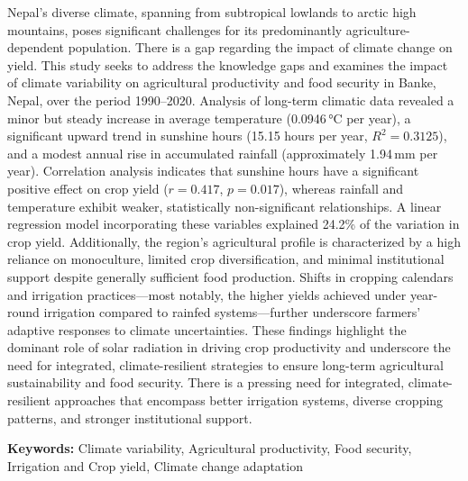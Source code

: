 Nepal's diverse climate, spanning from subtropical lowlands to arctic high mountains, poses significant challenges for its predominantly agriculture-dependent population. There is a gap regarding the impact of climate change on yield. This study seeks to address the knowledge gaps and examines the impact of climate variability on agricultural productivity and food security in Banke, Nepal, over the period 1990--2020. Analysis of long-term climatic data revealed a minor but steady increase in average temperature (0.0946\,°C per year), a significant upward trend in sunshine hours (15.15 hours per year, $R^2 = 0.3125$), and a modest annual rise in accumulated rainfall (approximately 1.94\,mm per year). Correlation analysis indicates that sunshine hours have a significant positive effect on crop yield ($r = 0.417$, $p = 0.017$), whereas rainfall and temperature exhibit weaker, statistically non-significant relationships. A linear regression model incorporating these variables explained 24.2\% of the variation in crop yield. Additionally, the region's agricultural profile is characterized by a high reliance on monoculture, limited crop diversification, and minimal institutional support despite generally sufficient food production. Shifts in cropping calendars and irrigation practices—most notably, the higher yields achieved under year-round irrigation compared to rainfed systems—further underscore farmers' adaptive responses to climate uncertainties. These findings highlight the dominant role of solar radiation in driving crop productivity and underscore the need for integrated, climate-resilient strategies to ensure long-term agricultural sustainability and food security. There is a pressing need for integrated, climate-resilient approaches that encompass better irrigation systems, diverse cropping patterns, and stronger institutional support.


\noindent \textbf{Keywords:} Climate variability, Agricultural productivity, Food security, Irrigation and Crop yield, Climate change adaptation

